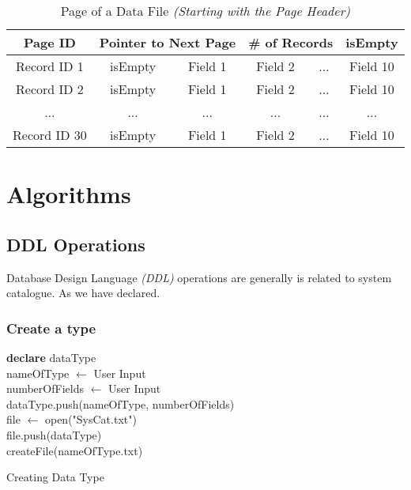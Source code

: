 \documentclass[12pt,a4paper]{article}
\begin{document}
        \begin{table}[h!]
            \begin{center}
                \begin{tabular}{ | c | c | c | c | c | c | }
                \hline
                    \multicolumn{1}{||c|}{Page ID} &
                    \multicolumn{2}{|c|}{Pointer to Next Page} &
                    \multicolumn{2}{|c|}{\# of Records} &
                    \multicolumn{1}{|c||}{isEmpty} \\
                \hline
                \hline
                Record ID 1 & isEmpty & Field 1 & Field 2 & ... & Field 10 \\
                \hline
                Record ID 2 & isEmpty & Field 1 & Field 2 & ... & Field 10 \\
                \hline
                ... & ... & ... & ... & ... & ... \\
                \hline
                Record ID 30 & isEmpty & Field 1 & Field 2 & ... & Field 10 \\
                \hline
                \end{tabular}
            \end{center}
    \caption{Page of a Data File \emph{(Starting with the Page Header)}}
    \label{table:1}
    \end{table}

\section{Algorithms}
    \subsection{DDL Operations}
        Database Design Language \emph{(DDL)} operations are generally is related to system catalogue. As we have declared.
        \subsubsection{Create a type}
        \IncMargin{1em}
            \begin{algorithm}[H]
                \SetAlgoLined
                 \textbf{declare} dataType \\
                 nameOfType $\leftarrow$ User Input \\
                 numberOfFields $\leftarrow$ User Input \\
                 dataType.push(nameOfType, numberOfFields) \\
                 file $\leftarrow$ open("SysCat.txt") \\
                 file.push(dataType) \\
                 createFile(nameOfType.txt)
                 \caption{Creating Data Type}
            \end{algorithm}
        \DecMargin{1em}
\end{document}
